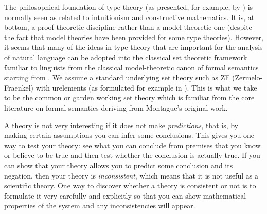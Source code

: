 The philosophical foundation of type theory (as presented, for
example, by \citealp{Martin-Loef1984}) is normally seen as related to
intuitionism and constructive mathematics.  It is, at bottom,  a proof-theoretic
discipline rather than a model-theoretic one (despite the fact that model
theories have been provided for some type theories).  However, it seems that
many of the ideas in type theory that are important for the analysis
of natural language can be adopted into the classical set theoretic
framework familiar to linguists from the classical model-theoretic canon of formal
semantics starting from \cite{Montague1974}.  We
assume a standard underlying set theory such as ZF
(Zermelo-Fraenkel) with urelements (as formulated for example in \citealp{Suppes1960}).  This is what we take to be the
common or garden working set theory which is familiar from the core
literature on formal semantics deriving from Montague's original work.   

A theory is not very interesting if it does not
make \textit{predictions}, that is, by making certain assumptions you
can infer some conclusions.  This gives you one way to test your
theory:  see what you can conclude from premises that you know or
believe to be true and then test whether the conclusion is actually
true.  If you can show that your theory allows you to predict some
conclusion and its negation, then your theory is
\textit{inconsistent}, which means that it is not useful as a
scientific theory.  One way to discover whether a theory is consistent
or not is to formulate it very carefully and explicitly so that you
can show mathematical properties of the system and any
inconsistencies will appear. 

